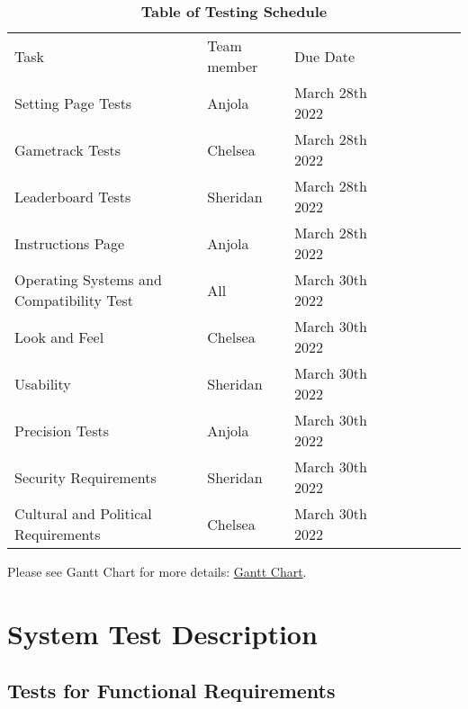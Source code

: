 \documentclass[12pt, titlepage]{article}
\begin{document}
	\begin{table}[H]
		\caption{\textbf{Table of Testing Schedule}} \label{Table}
		\begin{tabular}{|l|l|l|llllll}
			\cline{1-3}
			Task                                     & Team member & Due Date        &  &  &  &  &  &  \\ \cline{1-3}
			Setting Page Tests                       & Anjola      & March 28th 2022 &  &  &  &  &  &  \\ \cline{1-3}
			Gametrack Tests                          & Chelsea     & March 28th 2022 &  &  &  &  &  &  \\ \cline{1-3}
			Leaderboard Tests                        & Sheridan    & March 28th 2022 &  &  &  &  &  &  \\ \cline{1-3}
			Instructions Page                        & Anjola      & March 28th 2022 &  &  &  &  &  &  \\ \cline{1-3}
			Operating Systems and Compatibility Test & All         & March 30th 2022 &  &  &  &  &  &  \\ \cline{1-3}
			Look and Feel                            & Chelsea     & March 30th 2022 &  &  &  &  &  &  \\ \cline{1-3}
			Usability                                & Sheridan    & March 30th 2022 &  &  &  &  &  &  \\ \cline{1-3}
			Precision Tests                          & Anjola      & March 30th 2022 &  &  &  &  &  &  \\ \cline{1-3}
			Security Requirements                    & Sheridan    & March 30th 2022 &  &  &  &  &  &  \\ \cline{1-3}
			Cultural and Political Requirements      & Chelsea     & March 30th 2022 &  &  &  &  &  &  \\ \cline{1-3}
		\end{tabular}
	\end{table}
	
	Please see Gantt Chart for more details:
	\href{https://gitlab.cas.mcmaster.ca/maramotc/se3xa3/-/blob/main/ProjectSchedule/TestingGanttChart.pdf}{\color{blue}Gantt Chart}.
	
	
	\section{System Test Description}
	
	
	\subsection{Tests for Functional Requirements}
	
\end{document}
